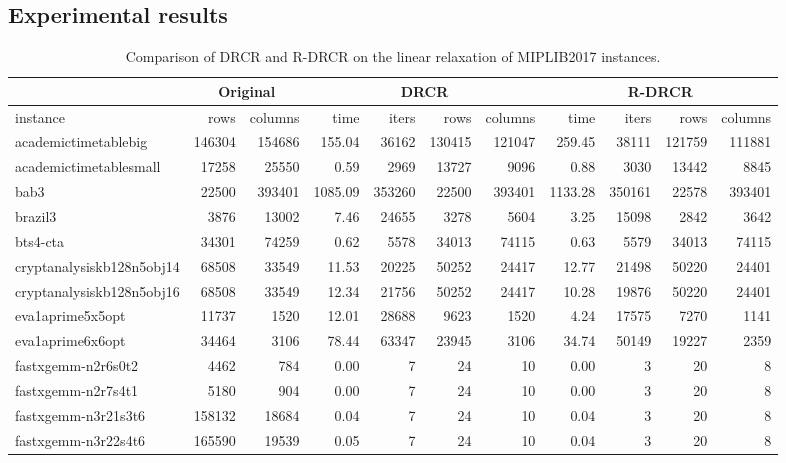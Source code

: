\documentclass[pdflatex,sn-mathphys-num]{sn-jnl}%
\theoremstyle{thmstyleone}%
\theoremstyle{thmstylethree}%
\theoremstyle{thmstyletwo}%
\begin{document}
\begin{appendices}
\newpage
\section{Experimental results}
\label{appendix_drcr_lp}
\tiny{
\begin{longtable}{l|r|r|r|r|r|r|r|r|r|r}
    \caption{Comparison of DRCR and R-DRCR on the linear relaxation of MIPLIB2017 instances.}
    \label{tab:complete_lp_drcr_results} \\
     & \multicolumn{2}{c|}{Original} & \multicolumn{4}{c|}{DRCR} & \multicolumn{4}{c}{R-DRCR} \\
    \hline
instance & rows & columns & time & iters & rows & columns & time & iters & rows & columns \\
\hline
academictimetablebig           & 146304 & 154686 & 155.04 & 36162 & 130415 & 121047 & 259.45 & 38111 & 121759 & 111881\\
academictimetablesmall         & 17258 & 25550 & 0.59 & 2969 & 13727 & 9096 & 0.88 & 3030 & 13442 & 8845\\
bab3                           & 22500 & 393401 & 1085.09 & 353260 & 22500 & 393401 & 1133.28 & 350161 & 22578 & 393401\\
brazil3                        & 3876 & 13002 & 7.46 & 24655 & 3278 & 5604 & 3.25 & 15098 & 2842 & 3642\\
bts4-cta                       & 34301 & 74259 & 0.62 & 5578 & 34013 & 74115 & 0.63 & 5579 & 34013 & 74115\\
cryptanalysiskb128n5obj14      & 68508 & 33549 & 11.53 & 20225 & 50252 & 24417 & 12.77 & 21498 & 50220 & 24401\\
cryptanalysiskb128n5obj16      & 68508 & 33549 & 12.34 & 21756 & 50252 & 24417 & 10.28 & 19876 & 50220 & 24401\\
eva1aprime5x5opt               & 11737 & 1520 & 12.01 & 28688 & 9623 & 1520 & 4.24 & 17575 & 7270 & 1141\\
eva1aprime6x6opt               & 34464 & 3106 & 78.44 & 63347 & 23945 & 3106 & 34.74 & 50149 & 19227 & 2359\\
fastxgemm-n2r6s0t2             & 4462 & 784 & 0.00 & 7 & 24 & 10 & 0.00 & 3 & 20 & 8\\
fastxgemm-n2r7s4t1             & 5180 & 904 & 0.00 & 7 & 24 & 10 & 0.00 & 3 & 20 & 8\\
fastxgemm-n3r21s3t6            & 158132 & 18684 & 0.04 & 7 & 24 & 10 & 0.04 & 3 & 20 & 8\\
fastxgemm-n3r22s4t6            & 165590 & 19539 & 0.05 & 7 & 24 & 10 & 0.04 & 3 & 20 & 8\\

\end{longtable}}
\end{appendices}
\end{document}
